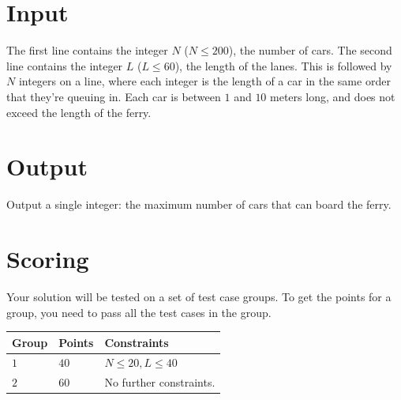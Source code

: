 \section*{Input}
The first line contains the integer $N$ ($N \le 200$), the number of cars.
The second line contains the integer $L$ ($L \le 60$), the length of the lanes.
This is followed by $N$ integers on a line, where each integer is the length of a car in the same order that they're queuing in.
Each car is between $1$ and $10$ meters long, and does not exceed the length of the ferry.

\section*{Output}
Output a single integer: the maximum number of cars that can board the ferry.

\section*{Scoring}
Your solution will be tested on a set of test case groups.
To get the points for a group, you need to pass all the test cases in the group.

\noindent
\begin{tabular}{| l | l | p{10cm} |}
\hline
Group & Points & Constraints \\ \hline
  $1$    & $40$        & $N \le 20, L \le 40$ \\ \hline 
  $2$    & $60$        & No further constraints. \\ \hline 
\end{tabular}

